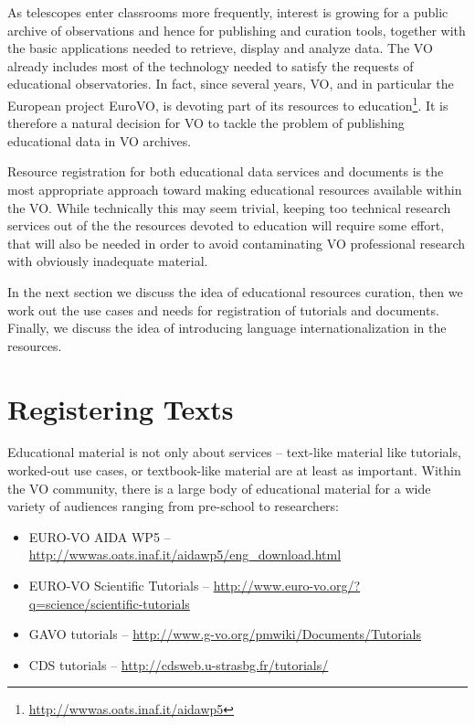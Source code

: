 \documentclass{ivoa}
\begin{document}
As telescopes enter classrooms more frequently, interest is growing for a 
public archive of observations and hence for publishing and curation tools, 
together with the basic applications needed to retrieve, display
and analyze data. The VO already includes most of the technology needed 
to satisfy the requests of educational observatories. In fact, since several 
years, VO, and in particular the European project EuroVO, is devoting part 
of its resources to
education\footnote{\url{http://wwwas.oats.inaf.it/aidawp5}}. It is 
therefore a natural decision for VO to tackle the problem of publishing 
educational data in VO archives.


Resource registration for both educational data services and documents 
is the most appropriate approach toward making educational resources 
available within the VO.  While
technically this may seem trivial, keeping too technical
research services out of the the resources devoted to education will
require some effort, that will also be needed in order to avoid contaminating 
VO professional research with obviously inadequate material.

In the next section we discuss the idea of educational resources curation, then 
we work out the use cases and needs for
registration of tutorials and documents. Finally, we discuss the idea of introducing language
internationalization in the resources.



\section{Registering Texts}

\label{sect:regext}

Educational material is not only about services – text-like material
like tutorials, worked-out use cases, or textbook-like material are at
least as important.  Within the VO community, there is a large body of
educational material for a wide variety of audiences ranging from pre-school to
researchers:

\begin{itemize}

\item EURO-VO AIDA WP5 -- \url{http://wwwas.oats.inaf.it/aidawp5/eng_download.html}

\item EURO-VO Scientific Tutorials -- \url{http://www.euro-vo.org/?q=science/scientific-tutorials}

\item GAVO tutorials --
\url{http://www.g-vo.org/pmwiki/Documents/Tutorials}

\item CDS tutorials -- \url{http://cdsweb.u-strasbg.fr/tutorials/}
\end{itemize}
\end{document}
